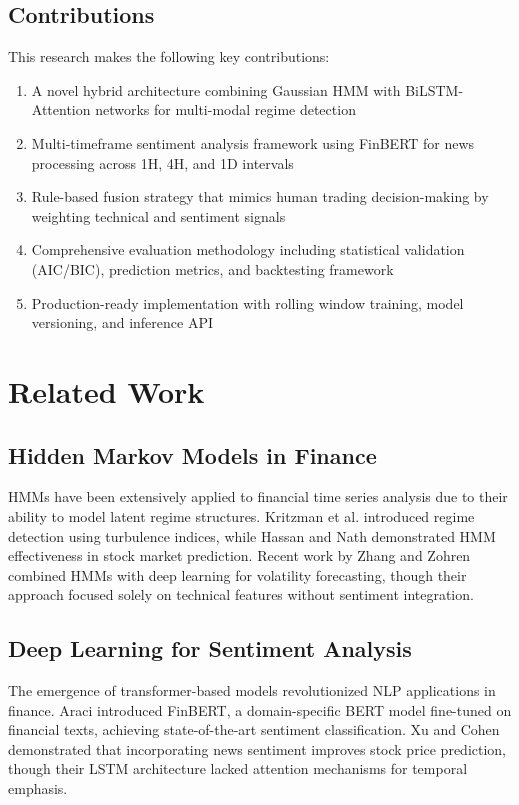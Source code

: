 \documentclass[conference]{IEEEtran}
\begin{document}
\subsection{Contributions}
This research makes the following key contributions:
\begin{enumerate}
\item A novel hybrid architecture combining Gaussian HMM with BiLSTM-Attention networks for multi-modal regime detection
\item Multi-timeframe sentiment analysis framework using FinBERT for news processing across 1H, 4H, and 1D intervals
\item Rule-based fusion strategy that mimics human trading decision-making by weighting technical and sentiment signals
\item Comprehensive evaluation methodology including statistical validation (AIC/BIC), prediction metrics, and backtesting framework
\item Production-ready implementation with rolling window training, model versioning, and inference API
\end{enumerate}

\section{Related Work}

\subsection{Hidden Markov Models in Finance}
HMMs have been extensively applied to financial time series analysis due to their ability to model latent regime structures. Kritzman et al. \cite{kritzman2012} introduced regime detection using turbulence indices, while Hassan and Nath \cite{hassan2005} demonstrated HMM effectiveness in stock market prediction. Recent work by Zhang and Zohren \cite{zhang2019} combined HMMs with deep learning for volatility forecasting, though their approach focused solely on technical features without sentiment integration.

\subsection{Deep Learning for Sentiment Analysis}
The emergence of transformer-based models revolutionized NLP applications in finance. Araci \cite{araci2019} introduced FinBERT, a domain-specific BERT model fine-tuned on financial texts, achieving state-of-the-art sentiment classification. Xu and Cohen \cite{xu2018} demonstrated that incorporating news sentiment improves stock price prediction, though their LSTM architecture lacked attention mechanisms for temporal emphasis.
\end{document}
